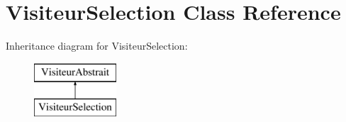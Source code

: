 \hypertarget{class_visiteur_selection}{}\section{Visiteur\+Selection Class Reference}
\label{class_visiteur_selection}
Inheritance diagram for Visiteur\+Selection\+:\begin{figure}[H]
\begin{center}
\leavevmode
\includegraphics[height=2.000000cm]{class_visiteur_selection}
\end{center}
\end{figure}
